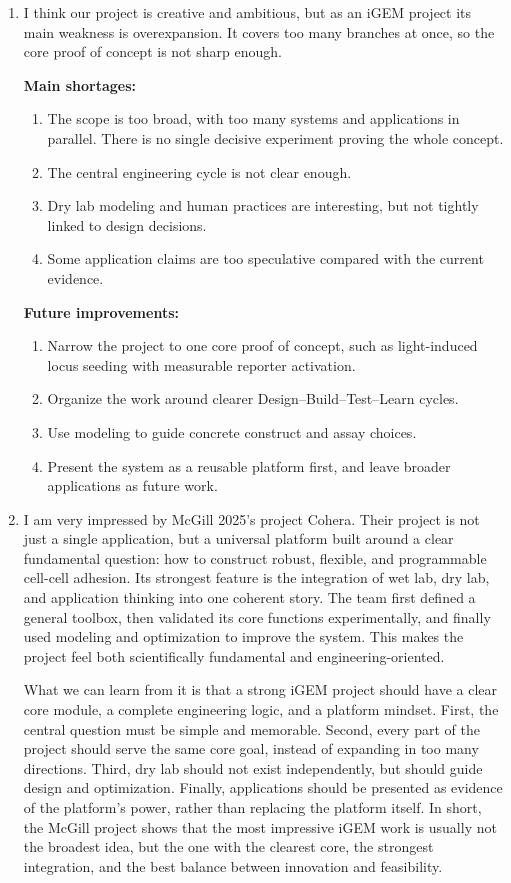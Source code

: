 \documentclass[12pt,a4paper]{article}
\begin{document}
\begin{enumerate}[parsep=0.5\baselineskip] 
  \item I think our project is creative and ambitious, but as an iGEM project its main weakness is overexpansion. It covers too many branches at once, so the core proof of concept is not sharp enough.
  
  \textbf{Main shortages:}
  \begin{enumerate}
    \item The scope is too broad, with too many systems and applications in parallel. There is no single decisive experiment proving the whole concept.
    \item The central engineering cycle is not clear enough.
    \item Dry lab modeling and human practices are interesting, but not tightly linked to design decisions.
    \item Some application claims are too speculative compared with the current evidence.
  \end{enumerate}
  \textbf{Future improvements:}
  \begin{enumerate}
    \item Narrow the project to one core proof of concept, such as light-induced locus seeding with measurable reporter activation.
    \item Organize the work around clearer Design--Build--Test--Learn cycles.
    \item Use modeling to guide concrete construct and assay choices.
    \item Present the system as a reusable platform first, and leave broader applications as future work.
  \end{enumerate}

  \item I am very impressed by McGill 2025's project Cohera. Their project is not just a single application, but a universal platform built around a clear fundamental question: how to construct robust, flexible, and programmable cell-cell adhesion. Its strongest feature is the integration of wet lab, dry lab, and application thinking into one coherent story. The team first defined a general toolbox, then validated its core functions experimentally, and finally used modeling and optimization to improve the system. This makes the project feel both scientifically fundamental and engineering-oriented.

  What we can learn from it is that a strong iGEM project should have a clear core module, a complete engineering logic, and a platform mindset. First, the central question must be simple and memorable. Second, every part of the project should serve the same core goal, instead of expanding in too many directions. Third, dry lab should not exist independently, but should guide design and optimization. Finally, applications should be presented as evidence of the platform's power, rather than replacing the platform itself. In short, the McGill project shows that the most impressive iGEM work is usually not the broadest idea, but the one with the clearest core, the strongest integration, and the best balance between innovation and feasibility.
\end{enumerate}
\end{document}
